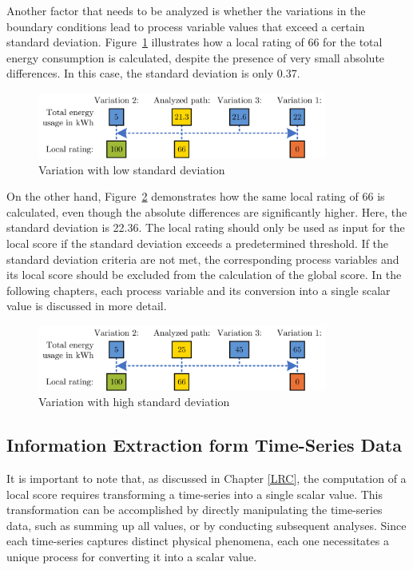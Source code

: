 Another factor that needs to be analyzed is whether the variations in the boundary conditions lead to process variable values that exceed a certain standard deviation. Figure~\ref{lowstd} illustrates how a local rating of 66 for the total energy consumption is calculated, despite the presence of very small absolute differences. In this case, the standard deviation is only 0.37.

\begin{figure}[H]
	\centerline{\includegraphics[width=0.85\textwidth]{figures/lowstd.png}}
	\caption{Variation with low standard deviation}
	\label{lowstd}
\end{figure}

 On the other hand, Figure~\ref{highstd} demonstrates how the same local rating of 66 is calculated, even though the absolute differences are significantly higher. Here, the standard deviation is 22.36. The local rating should only be used as input for the local score if the standard deviation exceeds a predetermined threshold. If the standard deviation criteria are not met, the corresponding process variables and its local score should be excluded from the calculation of the global score. In the following chapters, each process variable and its conversion into a single scalar value is discussed in more detail. 

\begin{figure}[H]
	\centerline{\includegraphics[width=0.85\textwidth]{figures/highstd.png}}
	\caption{Variation with high standard deviation}
	\label{highstd}
\end{figure}

 
\subsection{Information Extraction form Time-Series Data}\label{extraction}
It is important to note that, as discussed in Chapter \ref{LRC}, the computation of a local score requires transforming a time-series into a single scalar value. This transformation can be accomplished by directly manipulating the time-series data, such as summing up all values, or by conducting subsequent analyses. Since each time-series captures distinct physical phenomena, each one necessitates a unique process for converting it into a scalar value.





